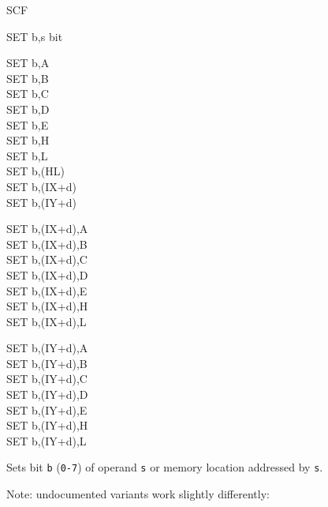 \begin{basedescript}{
    \desclabelstyle{\multilinelabel}
    \desclabelwidth{3cm}}
\begin{DetailItem}{SCF}
        \begin{DetailTiming}
        \end{DetailTiming}

    \end{DetailItem}

    \pagebreak
    \begin{DetailItem}{SET b,s}
        { bit}
        {}

        \begin{DetailVariants}
            SET b,A\\
            SET b,B\\
            SET b,C\\
            SET b,D\\
            SET b,E\\
            SET b,H\\
            SET b,L\\
            SET b,(HL)\\
            SET b,(IX+d)\\
            SET b,(IY+d)

            \columnbreak
            SET b,(IX+d),A\UNDOC\\
            SET b,(IX+d),B\UNDOC\\
            SET b,(IX+d),C\UNDOC\\
            SET b,(IX+d),D\UNDOC\\
            SET b,(IX+d),E\UNDOC\\
            SET b,(IX+d),H\UNDOC\\
            SET b,(IX+d),L\UNDOC

            \columnbreak
            SET b,(IY+d),A\UNDOC\\
            SET b,(IY+d),B\UNDOC\\
            SET b,(IY+d),C\UNDOC\\
            SET b,(IY+d),D\UNDOC\\
            SET b,(IY+d),E\UNDOC\\
            SET b,(IY+d),H\UNDOC\\
            SET b,(IY+d),L\UNDOC
        \end{DetailVariants}

        Sets bit {\tt b} ({\tt 0-7}) of operand {\tt s} or memory location addressed by {\tt s}.

        Note: undocumented variants work slightly differently:

        \begin{multicols}{2}


\end{multicols}
\end{DetailItem}
\end{basedescript}
